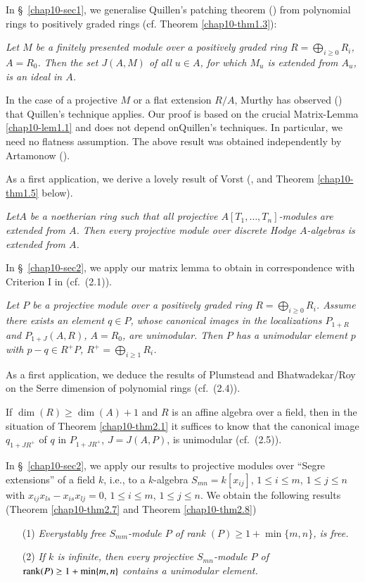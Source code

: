 In \S\ \ref{chap10-sec1}, we generalise Quillen's patching theorem
(\cite[Theorem 1]{chap10-Qu}) from polynomial rings to positively graded rings
(cf. Theorem \ref{chap10-thm1.3}):

{\em Let $M$ be a finitely presented module over a positively graded
ring $R=\bigoplus\limits_{i\geq 0}R_{i}$, $A=R_{0}$. Then the set
$J(A,M)$ of all $u\in A$, for which $M_{u}$ is extended from $A_{u}$,
is an ideal in $A$.}

In the case of a projective $M$ or a flat extension $R/A$, Murthy has\break
observed (\cite[Theorem 3.6]{chap10-Mu}) that Quillen's
technique applies. Our proof is based on the crucial
Matrix-Lemma \ref{chap10-lem1.1} and does not depend on\break Quillen's
techniques. In particular, we need no flatness assumption. The above
result was obtained independently by Artamonow (\cite{chap10-Ar}).

As a first application, we derive a lovely result of Vorst
(\cite[Theorem 3.2]{chap10-Vo}, and
Theorem \ref{chap10-thm1.5} below).

{\em Let\pageoriginale $A$ be a noetherian ring such that all
projective $A[T_{1},\ldots,T_{n}]$-modules are extended from $A$. Then
every projective module over discrete Hodge $A$-algebras is extended
from $A$.}

In \S\ \ref{chap10-sec2}, we apply our matrix lemma to obtain in
correspondence with Criterion I in \cite{chap10-Bh/Li/Ra} (cf.~(2.1)).  

{\em Let $P$ be a projective module over a positively graded ring
$R=\bigoplus\limits_{i\geq 0}R_{i}$. Assume there exists an element
$q\in P$, whose canonical images in the localizations $P_{1+R}$ and
$P_{1+J}(A,R)$, $A=R_{0}$, are unimodular. Then $P$ has a unimodular
element $p$ with $p-q\in R^{+}P$, $R^{+}=\bigoplus\limits_{i\geq
1}R_{i}$.}

As a first application, we deduce the results of Plumstead and
Bhatwadekar/Roy on the Serre dimension of polynomial rings
(cf.~(2.4)). 

If $\dim(R)\geq \dim(A)+1$ and $R$ is an affine algebra over a field,
then in the situation of Theorem \ref{chap10-thm2.1} it suffices to
know that the canonical image $q_{1+JR^{+}}$ of $q$ in $P_{1+JR^{+}}$,
$J=J(A,P)$, is unimodular (cf.~(2.5)).

In \S\ \ref{chap10-sec2}, we apply our results to projective modules
over ``Segre extensions'' of a field $k$, i.e., to a $k$-algebra
$S_{mn}=k[x_{ij}]$, $1\leq i\leq m$, $1\leq j\leq n$ with
$x_{ij}x_{ls}-x_{is}x_{lj}=0$, $1\leq i\leq m$, $1\leq j\leq n$. We
obtain the following results (Theorem \ref{chap10-thm2.7} and
Theorem \ref{chap10-thm2.8}) 
\begin{itemize}
\item[(1)] {\em Every\pageoriginale stably free $S_{mm}$-module $P$ of
rank $(P)\geq 1+\min \{m,n\}$, is free.}

\item[(2)] {\em If $k$ is infinite, then every projective
$S_{mn}$-module $P$ of $\operatorname{rank}(P)\geq 1+\min\{m,n\}$ contains a
unimodular element.}
\end{itemize}

